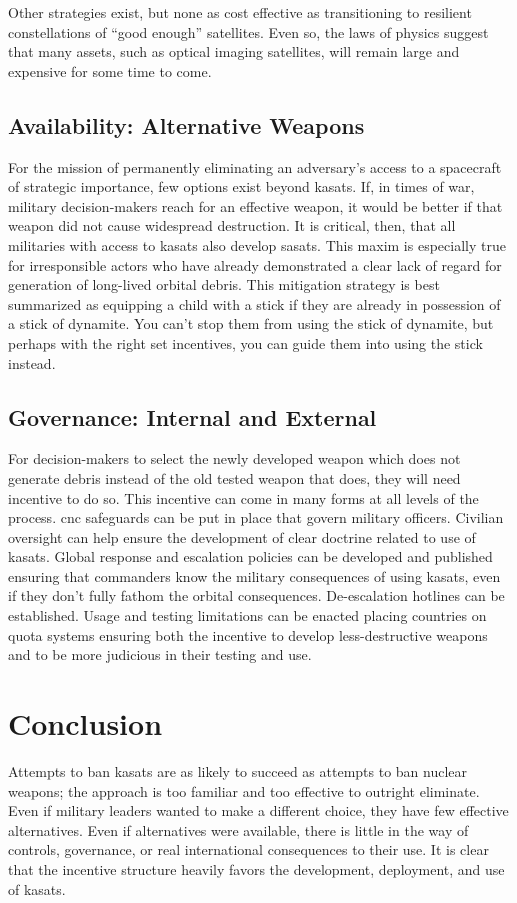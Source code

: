 Other strategies exist, but none as cost effective as transitioning to
resilient constellations of ``good enough'' satellites.  Even so, the
laws of physics suggest that many assets, such as optical imaging
satellites, will remain large and expensive for some time to come.

\subsection*{Availability: Alternative Weapons}
For the mission of permanently eliminating an adversary's access to a
spacecraft of strategic importance, few options exist beyond
\acp{kasat}.  If, in times of war, military decision-makers reach for
an effective weapon, it would be better if that weapon did not cause
widespread destruction.  It is critical, then, that all militaries
with access to \acp{kasat} also develop \acp{sasat}.  This maxim is
especially true for irresponsible actors who have already demonstrated
a clear lack of regard for generation of long-lived orbital debris.
This mitigation strategy is best summarized as equipping a child with
a stick if they are already in possession of a stick of dynamite.  You
can't stop them from using the stick of dynamite, but perhaps with the
right set incentives, you can guide them into using the stick instead.

\subsection*{Governance: Internal and External}
For decision-makers to select the newly developed weapon which does
not generate debris instead of the old tested weapon that does, they
will need incentive to do so.  This incentive can come in many forms
at all levels of the process. \ac{cnc} safeguards can be put in place
that govern military officers.  Civilian oversight can help ensure the
development of clear doctrine related to use of \acp{kasat}.  Global
response and escalation policies can be developed and published
ensuring that commanders know the military consequences of using
\acp{kasat}, even if they don't fully fathom the orbital consequences.
De-escalation hotlines can be established.  Usage and testing
limitations can be enacted placing countries on quota systems ensuring
both the incentive to develop less-destructive weapons and to be more
judicious in their testing and use.

\section*{Conclusion}
Attempts to ban \acp{kasat} are as likely to succeed as attempts to
ban nuclear weapons; the approach is too familiar and too effective to
outright eliminate.  Even if military leaders wanted to make a
different choice, they have few effective alternatives.  Even if
alternatives were available, there is little in the way of controls,
governance, or real international consequences to their use.  It is
clear that the incentive structure heavily favors the development,
deployment, and use of \acp{kasat}.

